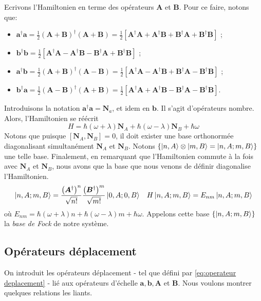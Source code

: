 \documentclass[11pt,oneside,a4paper]{article}
\newcommand{\h}{\ensuremath{\hbar}}
\begin{document}
Ecrivons l'Hamiltonien en terme des opérateurs $\bm{A}$ et $\bm{B}$. Pour ce faire, notons que:
\begin{itemize}
  \item $\bm{a}^\dagger\bm{a} = \frac{1}{2}\left(\bm{A}+\bm{B}\right)^\dagger\left(\bm{A}+\bm{B}\right) = \frac{1}{2}\left[\bm{A}^\dagger\bm{A}+\bm{A}^\dagger\bm{B}+\bm{B}^\dagger\bm{A}+\bm{B}^\dagger\bm{B}\right]$ ;\\
  \item $\bm{b}^\dagger\bm{b} = \frac{1}{2}\left[\bm{A}^\dagger\bm{A}-\bm{A}^\dagger\bm{B}-\bm{B}^\dagger\bm{A}+\bm{B}^\dagger\bm{B}\right]$ ;
  \item $\bm{a}^\dagger\bm{b} = \frac{1}{2}\left(\bm{A}+\bm{B}\right)^\dagger\left(\bm{A}-\bm{B}\right) = \frac{1}{2}\left[\bm{A}^\dagger\bm{A}-\bm{A}^\dagger\bm{B}+\bm{B}^\dagger\bm{A}-\bm{B}^\dagger\bm{B}\right]$ ;\\
  \item $\bm{b}^\dagger\bm{a} = \frac{1}{2}\left(\bm{A}-\bm{B}\right)^\dagger\left(\bm{A}+\bm{B}\right) = \frac{1}{2}\left[\bm{A}^\dagger\bm{A}+\bm{A}^\dagger\bm{B}-\bm{B}^\dagger\bm{A}-\bm{B}^\dagger\bm{B}\right]$.
\end{itemize}
Introduisons la notation $\bm{a}^\dagger\bm{a} = \bm{N}_a$, et idem en $\bm{b}$. Il s'agit d'opérateurs nombre. Alors, l'Hamiltonien se réécrit
\begin{equation}
  H = \h\left(\omega+\lambda\right)\bm{N}_A+\h\left(\omega-\lambda\right)\bm{N}_B+\h\omega
\end{equation}
Notons que puisque $[\bm{N}_A,\bm{N}_B] = 0$, il doit exister une base orthonormée diagonalisant simultanément $\bm{N}_A$ et $\bm{N}_B$. Notons $\left\{\ket{n,A}\otimes\ket{m,B} = \ket{n,A;m,B}\right\}$ une telle base. Finalement, en remarquant que l'Hamiltonien commute à la fois avec $\bm{N}_A$ et $\bm{N}_B$, nous avons que la base que nous venons de définir diagonalise l'Hamiltonien.
\begin{align*}
  \ket{n,A;m,B} &= \frac{\left(\bm{A}^\dagger\right)^n}{\sqrt{n!}}\frac{\left(\bm{B}^\dagger\right)^m}{\sqrt{m!}}\ket{0,A;0,B} &H\ket{n,A;m,B} = E_{nm}\ket{n,A;m,B}
\end{align*}
où $E_{nm} = \h\left(\omega+\lambda\right)n+\h\left(\omega-\lambda\right)m+\h\omega$. Appelons cette base $\left\{\ket{n,A;m,B}\right\}$ la \emph{base de Fock} de notre système.
\subsection{Opérateurs déplacement}
On introduit les opérateurs déplacement - tel que défini par \eqref{eq:operateur deplacement} - lié aux opérateurs d'échelle $\bm{a},\bm{b},\bm{A}$ et $\bm{B}$.
Nous voulons montrer quelques relations les liants.
\end{document}
